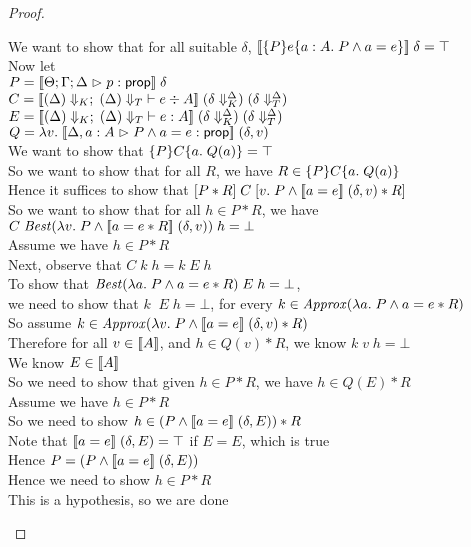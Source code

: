 \begin{proof}
\begin{tabbedproof}
\oo We want to show that for all suitable $\delta$, $\interp{\spec{P}{e}{a:A}{P \land a = e}}\;\delta = \top$ \\
\oo Now let \\
\oox $P = \interp{\judgeA{p}{\assert}}\;\delta$ \\
\oox $C = \interp{\judgeC[\restrictkind{\Delta}]{\restricttype{\Delta}}
                  {e}{A}} \;(\restricttyenv{\Delta}{\delta})
                          \;(\restrictvals{\Delta}{\delta})$ \\
\oox $E = \interp{\judgeE[\restrictkind{\Delta}]{\restricttype{\Delta}}
                  {e}{A}} \;(\restricttyenv{\Delta}{\delta})
                          \;(\restrictvals{\Delta}{\delta})$ \\
\oox $Q = \semfun{v}{\interp{\judgeA[\Delta, a:A]{P \land a = e}{\assert}}\;(\delta,v)}$ \\
\oo We want to show that $\spec{P}{C}{a}{Q(a)} = \top$ \\
\oo So we want to show that for all $R$, we have $R \in \spec{P}{C}{a}{Q(a)}$ \\
\oo Hence it suffices to show that $\basicspec{P * R}{C}{v}{P \land \interp{a = e}\;(\delta,v) * R}$ \\
\oo So we want to show that for all $h \in P * R$, we have $C\;\mathit{Best}(\semfun{v}{P \land \interp{a = e * R}\;(\delta,v)})\;h = \bot$ \\
\oo Assume we have $h \in P * R$ \\
\ooo Next, observe that $C\;k\;h = k\;E\;h$ \\
\ooo To show that $\mathit{Best}(\semfun{a}{P \land a = e * R})\;E\;h = \bot$, \\
\oox we need to show that $k\;\;E\;h = \bot$, for every $k \in \mathit{Approx}(\semfun{a}{P \land a = e *R})$ \\
\ooo So assume $k \in \mathit{Approx}(\semfun{v}{P \land \interp{a = e}\;(\delta,v) * R})$ \\
\oooo Therefore for all $v \in \interp{A}$, and $h \in Q(v) * R$, we know $k\;v\;h = \bot$ \\
\oooo We know $E \in \interp{A}$ \\
\oooo So we need to show that given $h \in P * R$, we have $h \in Q(E) * R$ \\
\ooooo Assume we have $h \in P * R$ \\
\ooooo So we need to show $h \in (P \land \interp{a = e}\;(\delta,E)) * R$ \\
\ooooo Note that $\interp{a = e}\;(\delta,E) = \top$ if $E = E$, which is true \\
\ooooo Hence $P = (P \land \interp{a = e}\;(\delta,E))$ \\
\ooooo Hence we need to show $h \in P * R$ \\
\ooooo This is a hypothesis, so we are done \\
\end{tabbedproof}
\end{proof}


